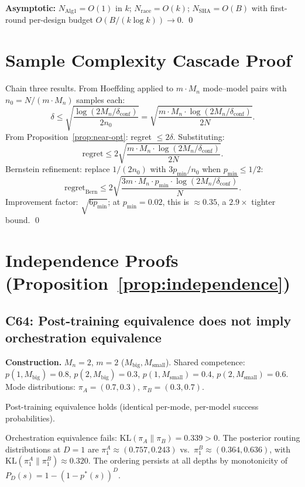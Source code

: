 \documentclass[11pt]{article}
\newcommand{\KL}{\mathrm{KL}}
\newcommand{\Mn}{M_n}
\newcommand{\pmin}{p_{\min}}
\newcommand{\dconf}{\delta_{\mathrm{conf}}}
\begin{document}
\textbf{Asymptotic:}
$N_{\mathrm{Alg1}} = O(1)$ in $k$;
$N_{\mathrm{race}} = O(k)$;
$N_{\mathrm{SHA}} = O(B)$ with first-round per-design budget
$O(B/(k\log k)) \to 0$. \qed

\section{Sample Complexity Cascade Proof}
\label{app:cascade}

Chain three results.  From Hoeffding applied to $m \cdot \Mn$ mode--model
pairs with $n_0 = N/(m \cdot \Mn)$ samples each:
\[
  \delta \le \sqrt{\frac{\log(2\Mn/\dconf)}{2n_0}}
  = \sqrt{\frac{m \cdot \Mn \cdot \log(2\Mn/\dconf)}{2N}}.
\]
From Proposition~\ref{prop:near-opt}: regret $\le 2\delta$.
Substituting:
\[
  \text{regret} \le 2\sqrt{\frac{m \cdot \Mn \cdot \log(2\Mn/\dconf)}{2N}}.
\]
Bernstein refinement: replace $1/(2n_0)$ with
$3\pmin/n_0$ when $\pmin \le 1/2$:
\[
  \text{regret}_{\mathrm{Bern}} \le
  2\sqrt{\frac{3m \cdot \Mn \cdot \pmin \cdot \log(2\Mn/\dconf)}{N}}.
\]
Improvement factor: $\sqrt{6\pmin}$; at $\pmin = 0.02$, this is
$\approx 0.35$, a $2.9\times$ tighter bound. \qed

\section{Independence Proofs (Proposition~\ref{prop:independence})}
\label{app:independence}

\subsection{C64: Post-training equivalence does not imply orchestration equivalence}

\textbf{Construction.}
$\Mn{=}2$, $m{=}2$ ($M_{\mathrm{big}}, M_{\mathrm{small}}$).
Shared competence:
$p(1, M_{\mathrm{big}}) = 0.8$, $p(2, M_{\mathrm{big}}) = 0.3$,
$p(1, M_{\mathrm{small}}) = 0.4$, $p(2, M_{\mathrm{small}}) = 0.6$.
Mode distributions: $\pi_A = (0.7, 0.3)$, $\pi_B = (0.3, 0.7)$.

Post-training equivalence holds (identical per-mode, per-model success
probabilities).

Orchestration equivalence fails: $\KL(\pi_A \| \pi_B) = 0.339 > 0$.
The posterior routing distributions at $D{=}1$ are
$\pi_1^A \approx (0.757, 0.243)$ vs.\
$\pi_1^B \approx (0.364, 0.636)$,
with $\KL(\pi_1^A \| \pi_1^B) \approx 0.320$.
The ordering persists at all depths by monotonicity of
$P_D(s) = 1 - (1-p^*(s))^D$.
\end{document}
